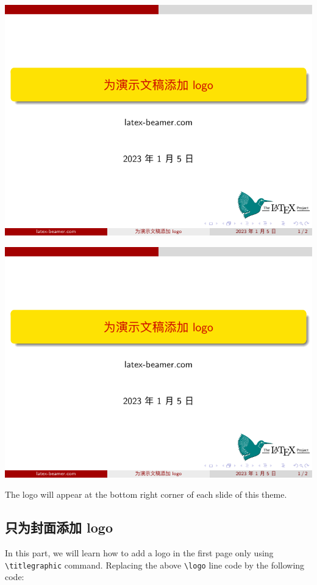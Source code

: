 \includegraphics[page=1]{examples/beamer/beamerlogo01.pdf}

\includegraphics[page=2]{examples/beamer/beamerlogo01.pdf}

The logo will appear at the bottom right corner of each slide of this theme.

\subsection{只为封面添加 logo}

In this part, we will learn how to add a logo in the first page only using \verb|\titlegraphic| command. Replacing the above \verb|\logo| line code by the following code:

